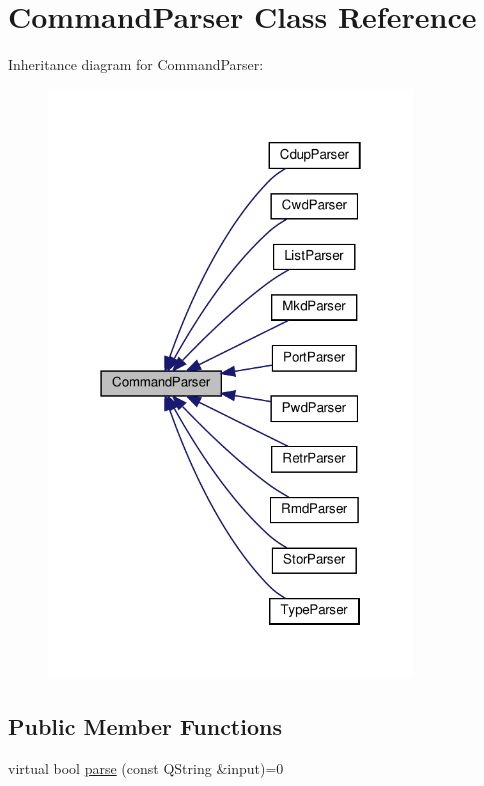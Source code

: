 \hypertarget{classCommandParser}{}\section{Command\+Parser Class Reference}
\label{classCommandParser}


Inheritance diagram for Command\+Parser\+:\nopagebreak
\begin{figure}[H]
\begin{center}
\leavevmode
\includegraphics[width=274pt]{dc/d9e/classCommandParser__inherit__graph}
\end{center}
\end{figure}
\subsection*{Public Member Functions}
\begin{DoxyCompactItemize}
\item 
virtual bool \hyperlink{classCommandParser_a5ed0855947a9b4500329f29b8123f2ea}{parse} (const Q\+String \&input)=0
\end{DoxyCompactItemize}


